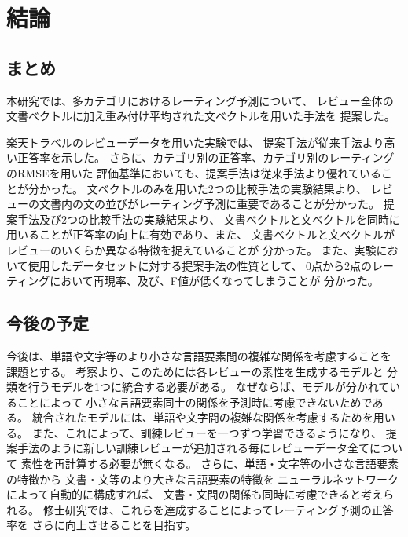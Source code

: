 \section{結論} \label{sec:Conclusion}

\subsection{まとめ}

本研究では、多カテゴリにおけるレーティング予測について、
レビュー全体の文書ベクトルに加え重み付け平均された文ベクトルを用いた手法を
提案した。

楽天トラベルのレビューデータを用いた実験では、
提案手法が従来手法\cite{fujitani15}より高い正答率を示した。
さらに、カテゴリ別の正答率、カテゴリ別のレーティングのRMSEを用いた
評価基準においても、提案手法は従来手法より優れていることが分かった。
文ベクトルのみを用いた2つの比較手法の実験結果より、
レビューの文書内の文の並びがレーティング予測に重要であることが分かった。
提案手法及び2つの比較手法の実験結果より、
文書ベクトルと文ベクトルを同時に用いることが正答率の向上に有効であり、また、
文書ベクトルと文ベクトルがレビューのいくらか異なる特徴を捉えていることが
分かった。
また、実験において使用したデータセットに対する提案手法の性質として、
0点から2点のレーティングにおいて再現率、及び、F値が低くなってしまうことが
分かった。


\subsection{今後の予定}

今後は、単語や文字等のより小さな言語要素間の複雑な関係を考慮することを
課題とする。
考察より、このためには各レビューの素性を生成するモデルと
分類を行うモデルを1つに統合する必要がある。
なぜならば、モデルが分かれていることによって
小さな言語要素同士の関係を予測時に考慮できないためである。
統合されたモデルには、単語や文字間の複雑な関係を考慮するため\nn を用いる。
また、これによって、訓練レビューを一つずつ学習できるようになり、
提案手法のように新しい訓練レビューが追加される毎にレビューデータ全てについて
素性を再計算する必要が無くなる。
さらに、単語・文字等の小さな言語要素の特徴から
文書・文等のより大きな言語要素の特徴を
ニューラルネットワークによって自動的に構成すれば、
文書・文間の関係も同時に考慮できると考えられる。
修士研究では、これらを達成することによってレーティング予測の正答率を
さらに向上させることを目指す。
